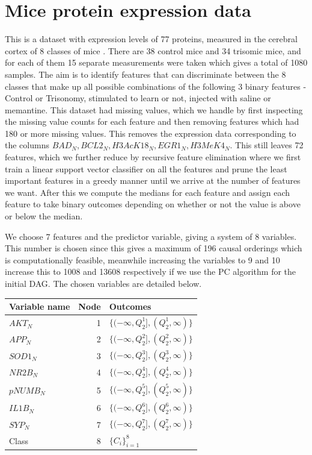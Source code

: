 \documentclass{tufte-book}
\begin{document}
\section{Mice protein expression data}
\label{sec:orge96f089}
This is a dataset with expression levels of 77 proteins, measured in the cerebral cortex of 8 classes of mice \cite{higuera-2015-self-organ}. There are 38 control mice and 34 trisomic mice, and for each of them 15 separate measurements were taken which gives a total of 1080 samples. The aim is to identify features that can discriminate between the 8 classes that make up all possible combinations of the following 3 binary features - Control or Trisonomy, stimulated to learn or not, injected with saline or memantine. This dataset had missing values, which we handle by first inspecting the missing value counts for each feature and then removing features which had 180 or more missing values. This removes the expression data corresponding to the columns \(BAD_N, BCL2_N, H3AcK18_N, EGR1_N, H3MeK4_N\). This still leaves 72 features, which we further reduce by recursive feature elimination \cite{guyon-2002} where we first train a linear support vector classifier on all the features and prune the least important features in a greedy manner until we arrive at the number of features we want. After this we compute the medians for each feature and assign each feature to take binary outcomes depending on whether or not the value is above or below the median.



We choose 7 features and the predictor variable, giving a system of 8 variables. This number is chosen since this gives a maximum of 196 causal orderings which is computationally feasible, meanwhile increasing the variables to 9 and 10 increase this to 1008 and 13608 respectively if we use the PC algorithm for the initial DAG. The chosen variables are detailed below.

\begin{center}
\begin{tabular}{l|r|l}
\hline
Variable name & Node & Outcomes\\
\hline
\(AKT_N\) & 1 & \(\{(-\infty, Q^1_2],(Q^1_2, \infty) \}\)\\
\(APP_N\) & 2 & \(\{(-\infty, Q^2_2],(Q^2_2, \infty) \}\)\\
\(SOD1_N\) & 3 & \(\{(-\infty, Q^3_2],(Q^3_2, \infty) \}\)\\
\(NR2B_N\) & 4 & \(\{(-\infty, Q^4_2],(Q^4_2, \infty) \}\)\\
\(pNUMB_N\) & 5 & \(\{(-\infty, Q^5_2],(Q^5_2, \infty) \}\)\\
\(IL1B_N\) & 6 & \(\{(-\infty, Q^6_2],(Q^6_2, \infty) \}\)\\
\(SYP_N\) & 7 & \(\{(-\infty, Q^7_2],(Q^7_2, \infty) \}\)\\
Class & 8 & \(\{C_i \}_{i=1}^8\)\\
\end{tabular}
\end{center}
\end{document}
